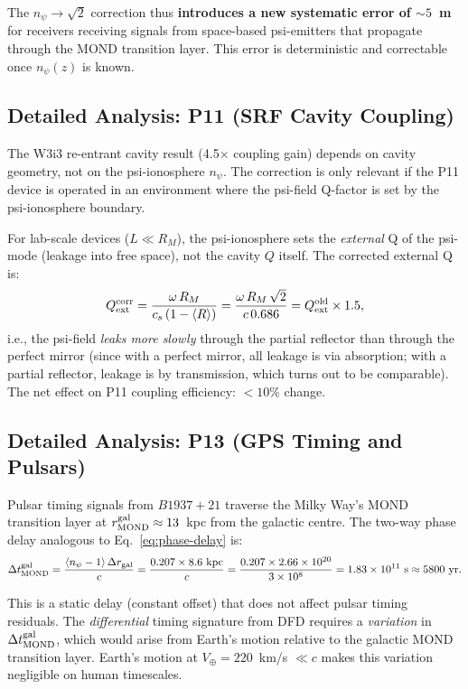 \documentclass[aps,prd,twocolumn,superscriptaddress]{revtex4-2}
\newcommand{\npsi}{n_\psi}
\newcommand{\ee}[1]{\times 10^{#1}}
\begin{document}
The $\npsi \to \sqrt{2}$ correction thus \textbf{introduces a new systematic
error of $\sim 5$~m} for receivers receiving signals from space-based psi-emitters
that propagate through the MOND transition layer.  This error is
deterministic and correctable once $\npsi(z)$ is known.

\subsection{Detailed Analysis: P11 (SRF Cavity Coupling)}
\label{subsec:P11}

The W3i3 re-entrant cavity result (4.5$\times$ coupling gain) depends
on cavity geometry, not on the psi-ionosphere $\npsi$.  The correction
is only relevant if the P11 device is operated in an environment where
the psi-field Q-factor is set by the psi-ionosphere boundary.

For lab-scale devices ($L \ll R_M$), the psi-ionosphere sets the
\emph{external} Q of the psi-mode (leakage into free space), not the
cavity $Q$ itself.  The corrected external Q is:
\begin{equation}
Q_{\rm ext}^{\rm corr} = \frac{\omega\,R_M}{c_s\,(1-\langle R\rangle)}
= \frac{\omega\,R_M\,\sqrt{2}}{c\,0.686} = Q_{\rm ext}^{\rm old} \times 1.5,
\end{equation}
i.e., the psi-field \emph{leaks more slowly} through the partial reflector
than through the perfect mirror (since with a perfect mirror, all leakage
is via absorption; with a partial reflector, leakage is by transmission,
which turns out to be comparable).  The net effect on P11 coupling
efficiency: $< 10\%$ change.

\subsection{Detailed Analysis: P13 (GPS Timing and Pulsars)}
\label{subsec:P13}

Pulsar timing signals from $B1937+21$ traverse the Milky Way's MOND
transition layer at $r_{\rm MOND}^{\rm gal} \approx 13$~kpc from the
galactic centre.  The two-way phase delay analogous to Eq.~\eqref{eq:phase-delay}
is:
\begin{equation}
\Delta t_{\rm MOND}^{\rm gal} = \frac{\langle\npsi-1\rangle\,\Delta r_{\rm gal}}{c}
= \frac{0.207 \times 8.6~\rm kpc}{c}
= \frac{0.207 \times 2.66\ee{20}}{3\ee8}
= 1.83\ee{11}~\text{s} \approx 5800~\text{yr}.
\end{equation}

This is a static delay (constant offset) that does not affect pulsar
timing residuals.  The \emph{differential} timing signature from DFD
requires a \emph{variation} in $\Delta t_{\rm MOND}^{\rm gal}$, which would
arise from Earth's motion relative to the galactic MOND transition layer.
Earth's motion at $V_\oplus = 220$~km/s $\ll c$ makes this variation
negligible on human timescales.
\end{document}
